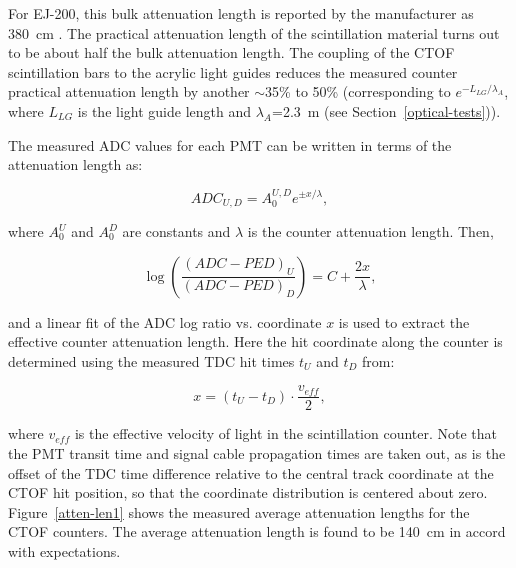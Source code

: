 \documentclass{elsart}
\begin{document}
For EJ-200, this bulk attenuation length is reported by the manufacturer as 380~cm
\cite{scint-spec}. The practical attenuation length of the scintillation material turns out to 
be about half the bulk attenuation length. The coupling of the CTOF scintillation bars to the 
acrylic light guides reduces the measured counter practical attenuation length by another 
$\sim$35\% to 50\% (corresponding to $e^{-L_{LG}/\lambda_A}$, where $L_{LG}$ is the light guide 
length and $\lambda_A$=2.3~m (see Section~\ref{optical-tests})).

The measured ADC values for each PMT can be written in terms of the attenuation length as:

\begin{equation}
\label{al-adc}
ADC_{U,D} = A_0^{U,D} e^{\pm x/\lambda},
\end{equation}

\noindent
where $A_0^U$ and $A_0^D$ are constants and $\lambda$ is the counter attenuation length. Then,

\begin{equation}
\label{linear}
\log \left( \frac{(ADC-PED)_U}{(ADC-PED)_D} \right ) = C + \frac{2x}{\lambda}, 
\end{equation}

\noindent
and a linear fit of the ADC log ratio vs. coordinate $x$ is used to extract the effective counter attenuation
length. Here the hit coordinate along the counter is determined using the measured TDC hit times $t_U$
and $t_D$ from:

\begin{equation}
\label{coor}
x = (t_U - t_D) \cdot \frac{v_{eff}}{2},
\end{equation}

\noindent
where $v_{eff}$ is the effective velocity of light in the scintillation counter. Note that the PMT transit
time and signal cable propagation times are taken out, as is the offset of the TDC time difference
relative to the central track coordinate at the CTOF hit position, so that the coordinate distribution is
centered about zero. Figure~\ref{atten-len1} shows the measured average attenuation lengths for the
CTOF counters. The average attenuation length is found to be 140~cm in accord with expectations. 
\end{document}
